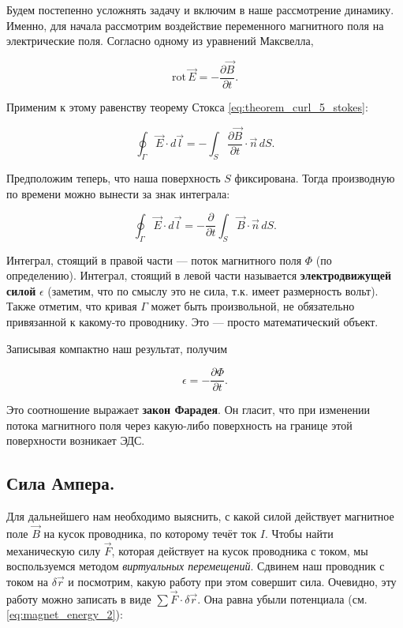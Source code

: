 \documentclass[12pt,a4paper]{article}
\numberwithin{equation}{section}
\numberwithin{equation}{section}
\newcommand{\pt}{\partial}
\newcommand{\rot}{\mathrm{rot}\,}
\newcommand{\eps}{\epsilon}
\begin{document}
Будем постепенно усложнять задачу и включим в наше рассмотрение
динамику. Именно, для начала рассмотрим воздействие переменного
магнитного поля на электрические поля. Согласно одному из уравнений
Максвелла, 

\begin{equation}
  \label{eq:der_faraday_1}
  \rot \vec{E} = -\frac{\pt \vec{B}}{\pt t}.
\end{equation}

Применим к этому равенству теорему Стокса
\eqref{eq:theorem_curl_5_stokes}:

\begin{equation}
  \label{eq:der_faraday_2}
  \oint_{\Gamma} \vec{E} \cdot d \vec{l} = - \int_S \frac{\pt
    \vec{B}}{\pt t} \cdot \vec{n}\, dS.
\end{equation}

Предположим теперь, что наша поверхность $S$ фиксирована. Тогда
производную по времени можно вынести за знак интеграла:

\begin{equation}
  \label{eq:der_faraday_3}
  \oint_{\Gamma} \vec{E} \cdot d \vec{l} = - \frac{\pt}{\pt t} \int_S
  \vec{B} \cdot \vec{n}\, dS.
\end{equation}

Интеграл, стоящий в правой части --- поток магнитного поля $\Phi$ (по
определению). Интеграл, стоящий в левой части называется
\textbf{электродвижущей силой} $\eps$ (заметим, что по смыслу это не сила,
т.к. имеет размерность вольт). Также отметим, что кривая $\Gamma$
может быть произвольной, не обязательно привязанной к какому-то
проводнику. Это --- просто математический объект. 

Записывая компактно наш результат, получим

\begin{equation}
  \label{eq:faradays_law}
  \eps = - \frac{\pt \Phi}{\pt t}.
\end{equation}

Это соотношение выражает \textbf{закон Фарадея}. Он гласит, что при
изменении потока магнитного поля через какую-либо поверхность на
границе этой поверхности возникает ЭДС.

\subsection{Сила Ампера.}
\label{sec:amperes_force}

Для дальнейшего нам необходимо выяснить, с какой силой действует
магнитное поле $\vec{B}$ на кусок проводника, по которому течёт ток
$I$. Чтобы найти механическую силу $\vec{F}$, которая действует на
кусок проводника с током, мы воспользуемся методом \textit{виртуальных
  перемещений}. Сдвинем наш проводник с током на $\delta \vec{r}$ и
посмотрим, какую работу при этом совершит сила. Очевидно, эту работу
можно записать в виде $\sum \vec{F} \cdot \delta \vec{r}$. Она равна
убыли потенциала (см. \eqref{eq:magnet_energy_2}):
\end{document}

